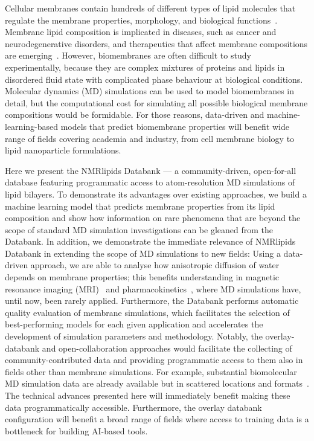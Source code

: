 \documentclass[fleqn,10pt]{wlscirep}
\begin{document}
Cellular membranes contain hundreds of different types of lipid molecules that regulate the membrane properties, morphology, and biological functions~\cite{vanmeer08,Lorent:2020a,Slatter:2016a}. Membrane lipid composition is implicated in diseases, such as cancer and neurodegenerative disorders, and therapeutics that affect membrane compositions are emerging~\cite{torres21}. However, biomembranes are often difficult to study experimentally, because they are complex mixtures of proteins and lipids in disordered fluid state with complicated phase behaviour at biological conditions. Molecular dynamics (MD) simulations can be used to model biomembranes in detail, but the computational cost for simulating all possible biological membrane compositions would be formidable. For those reasons, data-driven and machine-learning-based models that predict biomembrane properties will benefit wide range of fields covering academia and industry, from cell membrane biology to lipid nanoparticle formulations.

Here we present the NMRlipids Databank --- a community-driven, open-for-all database featuring programmatic access to atom-resolution MD simulations of lipid bilayers. To demonstrate its advantages over existing approaches, we build a machine learning model that predicts membrane properties from its lipid composition and show how information on rare phenomena that are beyond the scope of standard MD simulation investigations can be gleaned from the Databank. In addition, we demonstrate the immediate relevance of NMRlipids Databank in extending the scope of MD simulations to new fields: Using a data-driven approach, we are able to analyse how anisotropic diffusion of water depends on membrane properties; this benefits understanding in magnetic resonance imaging (MRI)~\cite{topgaard20} and pharmacokinetics~\cite{nitsche19}, where MD simulations have, until now, been rarely applied. Furthermore, the Databank performs automatic quality evaluation of membrane simulations, which facilitates the selection of best-performing models for each given application and accelerates the development of simulation parameters and methodology. Notably, the overlay-databank and open-collaboration approaches would facilitate the collecting of community-contributed data and providing programmatic access to them also in fields other than membrane simulations. For example, substantial biomolecular MD simulation data are already available but in scattered locations and formats~\cite{tiemann23}. The technical advances presented here will immediately benefit making these data programmatically accessible. Furthermore, the overlay databank configuration will benefit a broad range of fields where access to training data is a bottleneck for building AI-based tools.
\end{document}
